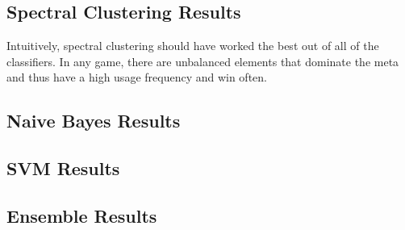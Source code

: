 \documentclass{acm_proc_article-sp}
\begin{document}
\subsection{Spectral Clustering Results}
Intuitively, spectral clustering should have worked the best out of all of the classifiers. In any game, there are unbalanced elements that dominate the meta and thus have a high usage frequency and win often.

\subsection{Naive Bayes Results}

\subsection{SVM Results}

\subsection{Ensemble Results}
\end{document}
